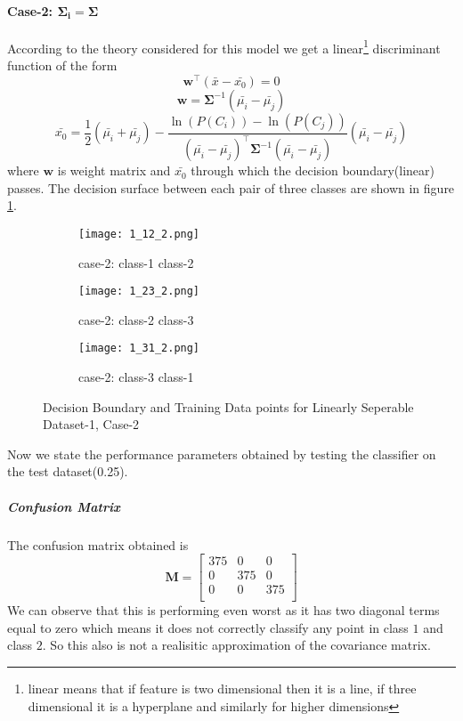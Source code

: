 \documentclass[a4paper]{article}
\begin{document}
\paragraph{Case-2: $\mathbf{\Sigma_{i}}=\mathbf{\Sigma}$}
According to the theory considered for this model we get a linear\footnote{linear means that if feature is two dimensional then it is a line, if three dimensional it is a hyperplane and similarly for higher dimensions} discriminant function of the form
\begin{equation}
\mathbf{w^{\intercal}}(\bar{x}-\bar{x_{0}})=0
\end{equation}
\[
\mathbf{w} = \mathbf{\Sigma}^{-1}(\bar{\mu_{i}}-\bar{\mu_{j}})
\]
\[
\bar{x_{0}} = \frac{1}{2}(\bar{\mu_{i}}+\bar{\mu_{j}})-\frac{\ln(P(C_{i}))-\ln(P(C_{j}))}{(\bar{\mu_{i}}-\bar{\mu_{j}})^{\intercal}\mathbf{\Sigma}^{-1}(\bar{\mu_{i}}-\bar{\mu_{j}})}(\bar{\mu_{i}}-\bar{\mu_{j}})
\]
where $\mathbf{w}$ is weight matrix and $\bar{x_{0}}$ through which the decision boundary(linear) passes. The decision surface between each pair of three classes are shown in figure \ref{fig:1_2}. 
\begin{figure}[h!]
  \centering
  \begin{subfigure}[b]{0.4\linewidth}
    \texttt{[image: 1\_12\_2.png]}
     \caption{case-2: class-1 class-2}
  \end{subfigure}
  \begin{subfigure}[b]{0.4\linewidth}
    \texttt{[image: 1\_23\_2.png]}
    \caption{case-2: class-2 class-3}
  \end{subfigure}
  \begin{subfigure}[b]{0.4\linewidth}
    \texttt{[image: 1\_31\_2.png]}
    \caption{case-2: class-3 class-1}
  \end{subfigure}
  \caption{Decision Boundary and Training Data points for Linearly Seperable Dataset-1, Case-2}
  \label{fig:1_2}
\end{figure}
Now we state the performance parameters obtained by testing the classifier on the test dataset(0.25).
\subparagraph{Confusion Matrix}\label{reason}
The confusion matrix obtained is
\[
\mathbf{M} = \left[ {\begin{array}{ccc}
375 & 0 & 0\\
0 & 375 & 0\\
0 & 0 & 375\\
\end{array}} \right]
\]We can observe that this is performing even worst as it has two diagonal terms equal to zero which means it does not correctly classify any point in class $1$ and class $2$. So this also is not a realisitic approximation of the covariance matrix.
\end{document}
